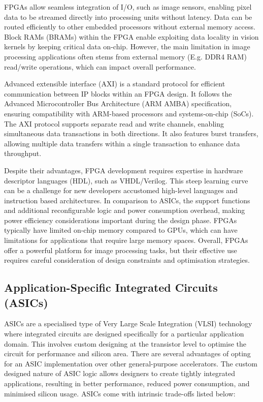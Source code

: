 FPGAs allow seamless integration of I/O, such as image sensors, enabling pixel data to be streamed directly into processing units without latency. Data can be routed efficiently to other embedded processors without external memory access. Block RAMs (BRAMs) within the FPGA enable exploiting data locality in vision kernels by keeping critical data on-chip. However, the main limitation in image processing applications often stems from external memory (E.g. DDR4 RAM) read/write operations, which can impact overall performance.

Advanced extensible interface (AXI) is a standard protocol for efficient communication between IP blocks within an FPGA design. It follows the Advanced Microcontroller Bus Architecture (ARM AMBA) specification, ensuring compatibility with ARM-based processors and systems-on-chip (SoCs). The AXI protocol supports separate read and write channels, enabling simultaneous data transactions in both directions. It also features burst transfers, allowing multiple data transfers within a single transaction to enhance data throughput.

Despite their advantages, FPGA development requires expertise in hardware descriptor languages (HDL), such as VHDL/Verilog. This steep learning curve can be a challenge for new developers accustomed high-level languages and instruction based architectures. In comparison to ASICs, the support functions and additional reconfigurable logic and power consumption overhead, making power efficiency considerations important during the design phase. FPGAs typically have limited on-chip memory compared to GPUs, which can have limitations for applications that require large memory spaces. Overall, FPGAs offer a powerful platform for image processing tasks, but their effective use requires careful consideration of design constraints and optimisation strategies.


\subsection{Application-Specific Integrated Circuits (ASICs)}
 ASICs are a specialised type of Very Large Scale Integration (VLSI) technology where integrated circuits are designed specifically for a particular application domain. This involves custom designing at the transistor level to optimise the circuit for performance and silicon area. There are several advantages of opting for an ASIC implementation over other general-purpose accelerators. The custom designed nature of ASIC logic allows designers to create tightly integrated applications, resulting in better performance, reduced power consumption, and minimised silicon usage. ASICs come with intrinsic trade-offs listed below:

